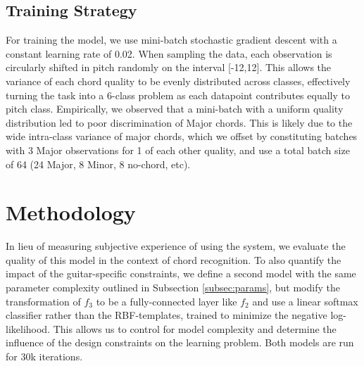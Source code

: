 \subsection{Training Strategy}
\label{subsec:strategy}

For training the model, we use mini-batch stochastic gradient descent with a constant learning rate of 0.02.
When sampling the data, each observation is circularly shifted in pitch randomly on the interval [-12,12].
This allows the variance of each chord quality to be evenly distributed across classes, effectively turning the task into a 6-class problem as each datapoint contributes equally to pitch class.
Empirically, we observed that a mini-batch with a uniform quality distribution led to poor discrimination of Major chords.
This is likely due to the wide intra-class variance of major chords, which we offset by constituting batches with 3 Major observations for 1 of each other quality, and use a total batch size of 64 (24 Major, 8 Minor, 8 no-chord, etc).


\section{Methodology}

In lieu of measuring subjective experience of using the system, we evaluate the quality of this model in the context of chord recognition.
To also quantify the impact of the guitar-specific constraints, we define a second model with the same parameter complexity outlined in Subsection \ref{subsec:params}, but modify the transformation of $f_3$ to be a fully-connected layer like $f_2$ and use a linear softmax classifier rather than the RBF-templates, trained to minimize the negative log-likelihood.
This allows us to control for model complexity and determine the influence of the design constraints on the learning problem.
Both models are run for 30k iterations.


